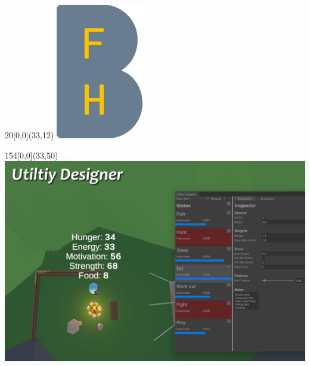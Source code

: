 %
%

\begin{titlepage}


\setlength{\unitlength}{1mm}
\begin{textblock}{20}[0,0](33,12)
	\includegraphics[scale=1.0]{images/BFH_Logo_B.png}
\end{textblock}


\begin{textblock}{154}[0,0](33,50)
	\includegraphics[scale=0.39]{images/title_image.png}			%
\end{textblock}


\end{titlepage}
